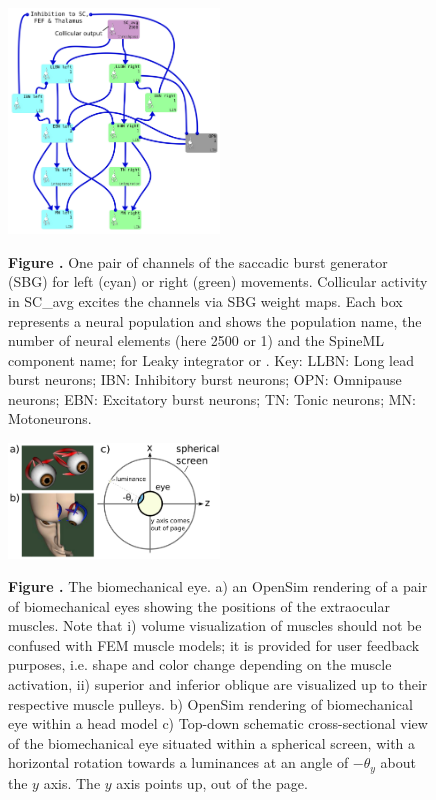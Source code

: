 \documentclass{frontiersSCNS}
\begin{document}
\begin{figure}[htb!]
\begin{center}
\includegraphics[width=0.5\textwidth]{./figures/Brain_Stem_1channel.png}
\end{center}
\textbf{\label{sbg} Figure .}
{ One pair of channels of the saccadic burst generator (SBG) for left
(cyan) or right (green) movements. Collicular activity in SC\_avg
excites the channels via SBG weight maps. Each box represents a neural
population and shows the population name, the number of neural
elements (here 2500 or 1) and the SpineML component name;  for
Leaky integrator or . Key: LLBN: Long lead burst
neurons; IBN: Inhibitory burst neurons; OPN: Omnipause neurons; EBN:
Excitatory burst neurons; TN: Tonic neurons; MN: Motoneurons.}
\end{figure}

\begin{figure}[htb!]
\begin{center}
\includegraphics[width=0.5\textwidth]{./figures/eye_screen_plus.png}
\end{center}
\textbf{\label{fig:bioeye} Figure .}
{ The biomechanical eye. a) an OpenSim rendering of a pair of
biomechanical eyes showing the positions of the extraocular
muscles. Note that i) volume visualization of muscles should not be
confused with FEM muscle models; it is provided for user feedback
purposes, i.e. shape and color change depending on the muscle
activation, ii) superior and inferior oblique are visualized up to
their respective muscle pulleys. b) OpenSim rendering of biomechanical
eye within a head model c) Top-down schematic cross-sectional view of
the biomechanical eye situated within a spherical screen, with a
horizontal rotation towards a luminances at an angle of $-\theta_{y}$
about the $y$ axis. The $y$ axis points up, out of the page.}
\end{figure}
\end{document}
